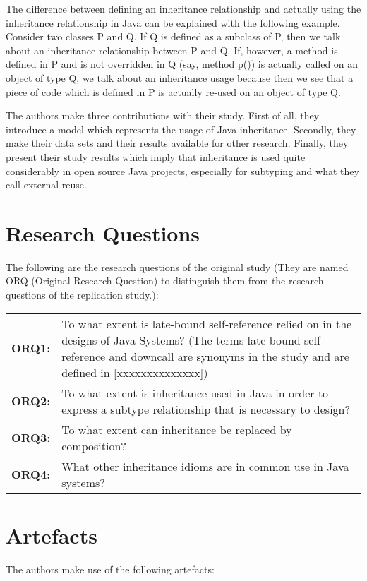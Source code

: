 \documentclass{uvamscse}
\begin{document}
The difference between defining an inheritance relationship and actually using the inheritance relationship in Java can be explained with the following example. Consider two classes P and Q. If Q is defined as a subclass of P, then we talk about an inheritance relationship between P and Q. If, however, a method is defined in P and is not overridden in Q (say, method p()) is actually called on an object of type Q, we talk about an inheritance usage because then we see that a piece of code which is defined in P is actually re-used on an object of type Q.

The authors make three contributions with their study. First of all, they introduce a model which represents the usage of Java inheritance. Secondly, they make their data sets and their results available for other research. Finally, they present their study results which imply that inheritance is used quite considerably in open source Java projects, especially for subtyping and what they call external reuse. 


\section{Research Questions} \label{OriginalRQuestions}

The following are the research questions of the original study (They are named ORQ (Original Research Question) to distinguish them from the research questions of the replication study.):


\begin{flushleft}
\begin{tabular}[t]{ p{20mm} p{110mm} }
  \bf{ORQ1:} &  To what extent is late-bound self-reference relied on in the designs of Java Systems? (The terms late-bound self-reference and downcall are synonyms in the study and are defined in [xxxxxxxxxxxxxx]) \\
  \bf{ORQ2:} &  To what extent is inheritance used in Java in order to express a subtype relationship that is necessary to design? \\
  \bf{ORQ3:} &  To what extent can inheritance be replaced by composition? \\
  \bf{ORQ4:} &  What other inheritance idioms are in common use in Java systems? \\
\end{tabular}
\end{flushleft}



\section{Artefacts}
The authors make use of the following artefacts:
\end{document}
